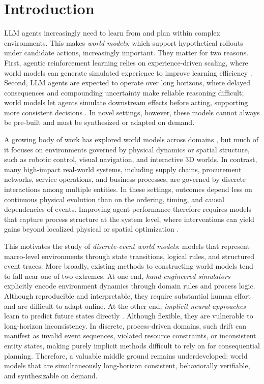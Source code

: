 \section{Introduction}
LLM agents increasingly need to learn from and plan within complex environments. This makes \emph{world models}, which support hypothetical rollouts under candidate actions, increasingly important. They matter for two reasons. First, agentic reinforcement learning relies on experience-driven scaling, where world models can generate simulated experience to improve learning efficiency \cite{ha2018recurrent,georgievpwm}. Second, LLM agents are expected to operate over long horizons, where delayed consequences and compounding uncertainty make reliable reasoning difficult; world models let agents simulate downstream effects before acting, supporting more consistent decisions \cite{hao2023reasoning,gu2024your}. In novel settings, however, these models cannot always be pre-built and must be synthesized or adapted on demand.


A growing body of work has explored world models across domains \cite{genie3,feng2025web}, but much of it focuses on environments governed by physical dynamics or spatial structure, such as robotic control, visual navigation, and interactive 3D worlds. In contrast, many high-impact real-world systems, including supply chains, procurement networks, service operations, and business processes, are governed by discrete interactions among multiple entities. In these settings, outcomes depend less on continuous physical evolution than on the ordering, timing, and causal dependencies of events. Improving agent performance therefore requires models that capture process structure at the system level, where interventions can yield gains beyond localized physical or spatial optimization \cite{mckinsey2019automation,mgi2021iot,gvr2025process}.

This motivates the study of \emph{discrete-event world models}: models that represent macro-level environments through state transitions, logical rules, and structured event traces.
More broadly, existing methods to constructing world models tend to fall near one of two extremes. 
At one end, \emph{hand-engineered simulators} explicitly encode environment dynamics through domain rules and process logic. Although reproducible and interpretable, they require substantial human effort and are difficult to adapt online. 
At the other end, \emph{implicit neural approaches} learn to predict future states directly \cite{hao2023reasoning,li2025word}. 
Although flexible, they are vulnerable to long-horizon inconsistency.
In discrete, process-driven domains, such drift can manifest as invalid event sequences, violated resource constraints, or inconsistent entity states, making purely implicit methods difficult to rely on for consequential planning. Therefore, a valuable middle ground remains underdeveloped: world models that are simultaneously long-horizon consistent, behaviorally verifiable, and synthesizable on demand. 


